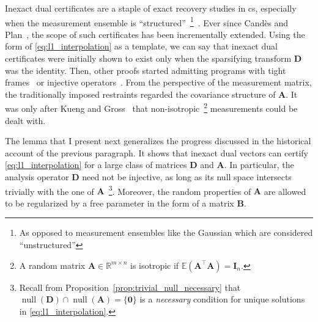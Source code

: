 Inexact dual certificates are a staple of exact recovery studies in \acrlong{cs}, especially when the measurement ensemble is ``structured''~\footnote{As opposed to measurement ensembles like the Gaussian which are considered ``unstructured''}~\cite{adcock2017,boyer2019,candes2011b}. Ever since Cand\`es and Plan~\cite{candes2011b}, the scope of such certificates has been incrementally extended. Using the form of \eqref{eq:l1_interpolation} as a template, we can say that inexact dual certificates were initially shown to exist only when the sparsifying transform $\mathbf{D}$ was the identity. Then, other proofs started admitting programs with tight frames~\cite{candes2011} or injective operators~\cite{lee2018}. From the perspective of the measurement matrix, the traditionally imposed restraints regarded the covariance structure of $\mathbf{A}$. It was only after Kueng and Gross~\cite{kueng2014} that non-isotropic~\footnote{A random matrix $\mathbf{A} \in \mathbb{R}^{m \times n}$ is isotropic if $\mathbb{E} \left ( \mathbf{A}^\top \mathbf{A}\right ) = \mathbf{I}_{n}$.} measurements could be dealt with.

The lemma that I present next generalizes the progress discussed in the historical account of the previous paragraph. It shows that inexact dual vectors can certify \eqref{eq:l1_interpolation} for a large class of matrices $\mathbf{D}$ and $\mathbf{A}$. In particular, the analysis operator $\mathbf{D}$ need not be injective, as long as its null space intersects trivially with the one of $\mathbf{A}$~\footnote{Recall from Proposition~\ref{prop:trivial_null_necessary} that $\operatorname{null} \left ( \mathbf{D} \right ) \cap \operatorname{null} \left ( \mathbf{A} \right ) = \{ \mathbf{0} \}$ is a \emph{necessary} condition for unique solutions in \eqref{eq:l1_interpolation}.}. Moreover, the random properties of $\mathbf{A}$ are allowed to be regularized by a free parameter in the form of a matrix $\mathbf{B}$.

